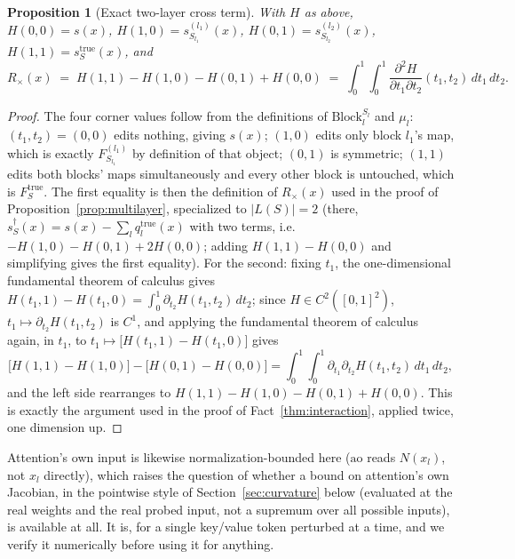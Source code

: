 \documentclass[11pt,a4paper]{article}
\newtheorem{proposition}{Proposition}
\begin{document}
\begin{proposition}[Exact two-layer cross term]
\label{prop:crossterm}
With $H$ as above, $H(0,0)=s(x)$, $H(1,0)=s_{S_{l_1}}^{(l_1)}(x)$,
$H(0,1)=s_{S_{l_2}}^{(l_2)}(x)$, $H(1,1)=s_S^{\mathrm{true}}(x)$, and
\[
R_\times(x) \;=\; H(1,1)-H(1,0)-H(0,1)+H(0,0)
\;=\; \int_0^1\!\!\int_0^1 \frac{\partial^2 H}{\partial t_1\partial t_2}(t_1,t_2)\,dt_1\,dt_2 .
\]
\end{proposition}

\begin{proof}
The four corner values follow from the definitions of $\mathrm{Block}_l^{S_l}$
and $\mu_l$: $(t_1,t_2)=(0,0)$ edits nothing, giving $s(x)$; $(1,0)$ edits only
block $l_1$'s map, which is exactly $F_{S_{l_1}}^{(l_1)}$ by definition of that
object; $(0,1)$ is symmetric; $(1,1)$ edits both blocks' maps simultaneously
and every other block is untouched, which is $F_S^{\mathrm{true}}$. The first
equality is then the definition of $R_\times(x)$ used in the proof of
Proposition~\ref{prop:multilayer}, specialized to $|L(S)|=2$ (there,
$s_S^\dagger(x)=s(x)-\sum_l q_l^{\mathrm{true}}(x)$ with two terms, i.e.\
$-H(1,0)-H(0,1)+2H(0,0)$; adding $H(1,1)-H(0,0)$ and simplifying gives the
first equality). For the second: fixing $t_1$, the one-dimensional
fundamental theorem of calculus gives
$H(t_1,1)-H(t_1,0)=\int_0^1\partial_{t_2}H(t_1,t_2)\,dt_2$; since
$H\in C^2([0,1]^2)$, $t_1\mapsto\partial_{t_2}H(t_1,t_2)$ is $C^1$, and
applying the fundamental theorem of calculus again, in $t_1$, to
$t_1\mapsto\bigl[H(t_1,1)-H(t_1,0)\bigr]$ gives
\[
\bigl[H(1,1)-H(1,0)\bigr]-\bigl[H(0,1)-H(0,0)\bigr]
= \int_0^1\!\!\int_0^1\partial_{t_1}\partial_{t_2}H(t_1,t_2)\,dt_1\,dt_2,
\]
and the left side rearranges to $H(1,1)-H(1,0)-H(0,1)+H(0,0)$. This is exactly
the argument used in the proof of Fact~\ref{thm:interaction}, applied
twice, one dimension up.
\end{proof}

Attention's own input is likewise normalization-bounded here ($\mathrm{ao}$
reads $N(x_l)$, not $x_l$ directly), which raises the question of whether a
bound on attention's own Jacobian, in the pointwise style of
Section~\ref{sec:curvature} below (evaluated at the real weights and the real
probed input, not a supremum over all possible inputs), is available at all.
It is, for a single key/value token perturbed at a time, and we verify it
numerically before using it for anything.
\end{document}
